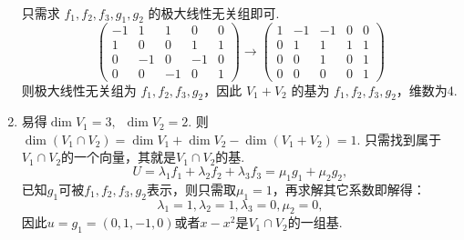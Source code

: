 \begin{exercise}
\begin{exgroup}
\begin{answer}
\begin{enumerate}
\begin{gather*}
                      \end{gather*}
                      只需求 $f_1,f_2,f_3,g_1,g_2$ 的极大线性无关组即可.
                      \[\begin{pmatrix}
                              -1 & 1  & 1  & 0  & 0 \\
                              1  & 0  & 0  & 1  & 1 \\
                              0  & -1 & 0  & -1 & 0 \\
                              0  & 0  & -1 & 0  & 1
                          \end{pmatrix}\rightarrow
                          \begin{pmatrix}1 & -1 & -1 & 0 & 0 \\
                 0 & 1  & 1  & 1 & 1 \\
                 0 & 0  & 1  & 0 & 1 \\
                 0 & 0  & 0  & 0 & 1
                          \end{pmatrix}\]
                      则极大线性无关组为 $f_1,f_2,f_3,g_2$，因此 $V_1+V_2$ 的基为 $f_1,f_2,f_3,g_2$，维数为4.

                \item 易得$\dim V_1=3,\enspace \dim V_2=2$. 则$\dim (V_1\cap V_2)= \dim V_1+\dim V_2-\dim (V_1+V_2)=1$. 只需找到属于$V_1\cap V_2$的一个向量，其就是$V_1\cap V_2$的基.
                      \[U=\lambda_1f_1+\lambda_2f_2+\lambda_3f_3= \mu_1g_1+\mu_2g_2,\]
                      已知$g_1$可被$f_1,f_2,f_3,g_2$表示，则只需取$\mu_1=1$，再求解其它系数即解得：
                      \[\lambda_1=1,\lambda_2=1,\lambda_3=0,\mu_2=0,\]
                      因此$u=g_1=(0,1,-1,0)$或者$x-x^2$是$V_1\cap V_2$的一组基.


\end{enumerate}
\end{answer}
\end{exgroup}
\end{exercise}
